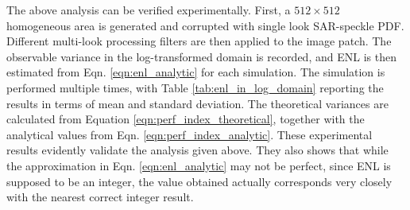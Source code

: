 The above analysis can be verified experimentally. First, a $512\times512$ homogeneous area is generated and 
corrupted with single look SAR-speckle PDF. 
Different multi-look processing filters are then applied to the image patch. 
The observable variance in the log-transformed domain is recorded, and 
	 ENL is then estimated from Eqn. \ref{eqn:enl_analytic} for each simulation.
The simulation is performed multiple times, with Table \ref{tab:enl_in_log_domain} reporting the results in terms 
of mean and standard deviation.
The theoretical variances are calculated from Equation \ref{eqn:perf_index_theoretical}, 
	together with the analytical values from Eqn. \ref{eqn:perf_index_analytic}.
These experimental results evidently validate the analysis given above.
They also shows that 
	while the approximation in Eqn. \ref{eqn:enl_analytic} may not be perfect, 
	since ENL is supposed to be an integer, the value obtained actually corresponds very closely with the 
	nearest correct integer result.


